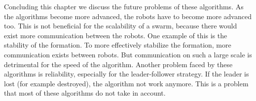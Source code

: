   \begin{table}[H]
  \renewcommand{\arraystretch}{1.3}
  \label{table_alg_formation}
  \caption{Overview of Collective Transport Algorithms}
  \centering
{}
  \end{table}

Concluding this chapter we discuss the future problems of these algorithms. 
As the algorithms become more advanced, the robots have to become more advanced too.
This is not beneficial for the scalability of a swarm, because there would exist more communication between the robots. 
One example of this is the stability of the formation. 
To more effectively stabilize the formation, more communication exists between robots. 
But communication on such a large scale is detrimental for the speed of the algorithm. 
Another problem faced by these algorithms is reliability, especially for the leader-follower strategy. 
If the leader is lost (for example destroyed), the algorithm   not work anymore. 
This is a problem that most of these algorithms do not take in account.  
